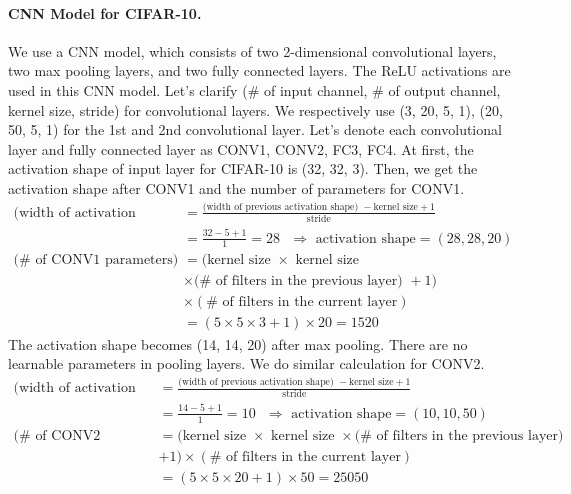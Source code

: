 \paragraph{CNN Model for CIFAR-10.} We use a CNN model, which consists of two 2-dimensional convolutional layers, two max pooling layers, and two fully connected layers. The ReLU activations are used in this CNN model. Let's clarify ($\#$ of input channel, $\#$ of output channel, kernel size, stride) for convolutional layers. We respectively use (3, 20, 5, 1), (20, 50, 5, 1) for the 1st and 2nd convolutional layer. Let's denote each convolutional layer and fully connected layer as CONV1, CONV2, FC3, FC4. At first, the activation shape of input layer for CIFAR-10 is (32, 32, 3). Then, we get the activation shape after CONV1 and the number of parameters for CONV1.
\begin{align*}
    (\textrm{width of activation shape) } &= \frac{\textrm{(width of previous activation shape) } - \textrm{kernel size} + 1}{\textrm{stride}} \\
    &= \frac{32-5+1}{1} = 28 \textrm{ } \Rightarrow \textrm{ activation shape} = (28, 28, 20) \\
    (\# \textrm{ of CONV1 parameters) } &= \Big(\textrm{kernel size } \times \textrm{ kernel size } \\
    &\times (\# \textrm{ of filters in the previous layer) }+1 \Big) \\
    &\times (\# \textrm{ of filters in the current layer}) \\
    &= (5 \times 5 \times 3 + 1) \times 20 = 1520
\end{align*}
The activation shape becomes (14, 14, 20) after max pooling. There are no learnable parameters in pooling layers. We do similar calculation for CONV2.
\begin{align*}
    (\textrm{width of activation shape) } &= \frac{\textrm{(width of previous activation shape) } - \textrm{kernel size} + 1}{\textrm{stride}} \\
    &= \frac{14-5+1}{1} = 10 \textrm{ } \Rightarrow \textrm{ activation shape} = (10, 10, 50) \\
    (\# \textrm{ of CONV2 parameters) } &= \Big(\textrm{kernel size } \times \textrm{ kernel size } \times (\# \textrm{ of filters in the previous layer) }\\
    &+1\Big) \times (\# \textrm{ of filters in the current layer}) \\
    &= (5 \times 5 \times 20 + 1) \times 50 = 25050
\end{align*}
